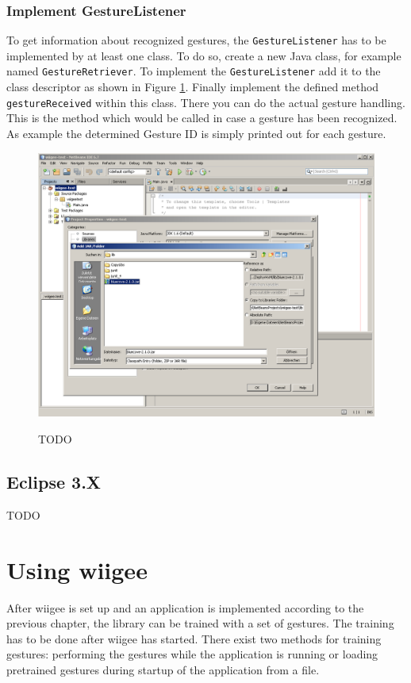 \documentclass[%
   11pt,              %
   english,           %
   a4paper,           %
   DIV11,             %
   BCOR12mm,		  %
   titlepage,		  %
   bibtotoc,		  %
   liststotoc,		  %
   final,			  %
   twoside,			  %
   openright,		  %
   cleardoubleempty   %
]{scrreprt}%
\begin{document}
\subsection{Implement GestureListener}
To get information about recognized gestures, the \texttt{GestureListener} has to be implemented by at least one class. To do so, create a new Java class, for example named \texttt{GestureRetriever}. To implement the \texttt{GestureListener} add it to the class descriptor as shown in Figure \ref{fig:implement_gesturelistener}. Finally implement the defined method \texttt{gestureReceived} within this class. There you can do the actual gesture handling. This is the method which would be called in case a gesture has been recognized. As example the determined Gesture ID is simply printed out for each gesture.

\begin{figure}[h!]
\centering
\includegraphics[width=0.95\linewidth]{img/setup/netbeans/step4.png}
\label{fig:implement_gesturelistener}
\caption{TODO}
\end{figure}

\section{Eclipse 3.X}
TODO

\chapter{Using wiigee}
After wiigee is set up and an application is implemented according to the previous chapter, the library can be trained with a set of gestures. The training has to be done after wiigee has started. There exist two methods for training gestures: performing the gestures while the application is running or loading pretrained gestures during startup of the application from a file.
\end{document}
